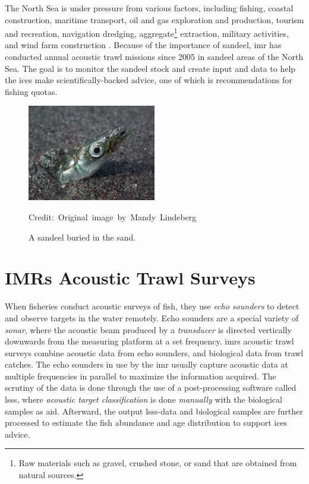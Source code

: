    The North Sea is under pressure from various factors, including fishing, coastal construction, maritime transport, oil and gas exploration and production, tourism and recreation, navigation dredging, aggregate\footnote{Raw materials such as gravel, crushed stone, or sand that are obtained from natural sources.} extraction, military activities, and wind farm construction \cite{ICES2021}. Because of the importance of sandeel, \gls{imr} has conducted annual acoustic trawl missions since 2005 in sandeel areas of the North Sea\cite{johnsen2017collective}. The goal is to monitor the sandeel stock and create input and data to help the \gls{ices} make scientifically-backed advice, one of which is recommendations for fishing quotas\cite{sizedependentfreqrespons2009johnsen}. 
    
    \begin{figure}[H]
        \centering

        \includegraphics[width=0.5\textwidth]{figures/Ammodytes_hexapterus.jpg} 

        \caption[Sandeel]{A sandeel buried in the sand.}
        \medskip 
        \hspace*{15pt}\hbox{\scriptsize Credit: Original image by Mandy Lindeberg\cite{sandeel_image}}
        \label{sandeel_image}
    \end{figure}

\section{IMRs Acoustic Trawl Surveys}
    When fisheries conduct acoustic surveys of fish, they use \textit{echo sounders} to detect and observe targets in the water remotely. Echo sounders are a special variety of \textit{sonar}, where the acoustic beam produced by a \textit{transducer} is directed vertically downwards from the measuring platform at a set frequency\cite{simmonds2008fisheries}. \gls{imr}s acoustic trawl surveys combine acoustic data from echo sounders, and biological data from trawl catches. The echo sounders in use by the \gls{imr} usually capture acoustic data at multiple frequencies in parallel to maximize the information acquired\cite{korneliussen2018acoustic}. The scrutiny of the data is done through the use of a post-processing software called \gls{lsss}, where \textit{acoustic target classification} is done \textit{manually} with the biological samples as aid\cite{korneliussen2006large}. Afterward, the output \gls{lsss}-data and biological samples are further processed to estimate the fish abundance and age distribution to support \gls{ices} advice\cite{johnsen2019stox}. 

